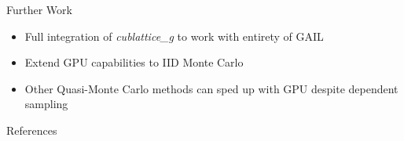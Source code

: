 \documentclass[11pt]{beamer}
\begin{document}
\begin{frame}{Further Work}
\begin{itemize}
\item Full integration of \textit{cublattice\_g} to work with entirety of GAIL
\item Extend GPU capabilities to IID Monte Carlo 
\item Other Quasi-Monte Carlo methods can sped up with GPU despite dependent sampling
\end{itemize}
\end{frame}

\begin{frame}{References}


\end{frame}
\end{document}
